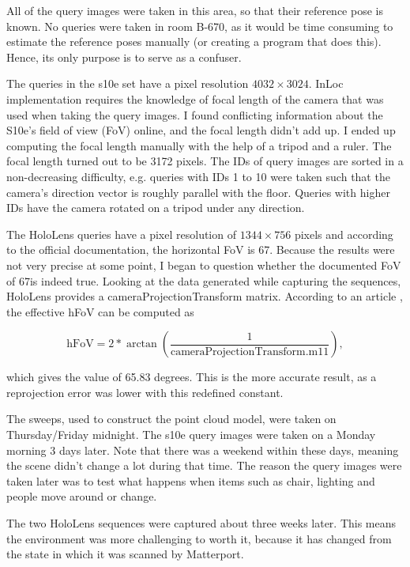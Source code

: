 \documentclass[twoside]{ctuthesis}
\theoremstyle{plain}
\theoremstyle{definition}
\theoremstyle{note}
\begin{document}
All of the query images were taken in this area, so that their reference pose is known. No queries were taken in room B-670, as it would be time consuming to estimate the reference poses manually (or creating a program that does this). Hence, its only purpose is to serve as a confuser.

The queries in the s10e set have a pixel resolution $4032 \times 3024$. InLoc implementation requires the knowledge of focal length of the camera that was used when taking the query images. I found conflicting information about the S10e's field of view (FoV) online, and the focal length didn't add up. I ended up computing the focal length manually with the help of a tripod and a ruler. The focal length turned out to be 3172 pixels. The IDs of query images are sorted in a non-decreasing difficulty, e.g. queries with IDs 1 to 10 were taken such that the camera's direction vector is roughly parallel with the floor. Queries with higher IDs have the camera rotated on a tripod under any direction.

The HoloLens queries have a pixel resolution of $1344 \times 756$ pixels and according to the official documentation, the horizontal FoV is 67\degree. Because the results were not very precise at some point, I began to question whether the documented FoV of 67\degree is indeed true. Looking at the data generated while capturing the sequences, HoloLens provides a cameraProjectionTransform matrix. According to an article \cite{HoloLensFoV}, the effective hFoV can be computed as

\begin{equation}
	\text{hFoV} = 2*\arctan \left(\frac{1}{\text{cameraProjectionTransform.m11}}\right),
\end{equation}

which gives the value of 65.83 degrees. This is the more accurate result, as a reprojection error was lower with this redefined constant.

The sweeps, used to construct the point cloud model, were taken on Thursday/Friday midnight. The s10e query images were taken on a Monday morning 3 days later. Note that there was a weekend within these days, meaning the scene didn't change a lot during that time. The reason the query images were taken later was to test what happens when items such as chair, lighting and people move around or change.

The two HoloLens sequences were captured about three weeks later. This means the environment was more challenging to worth it, because it has changed from the state in which it was scanned by Matterport.
\end{document}
